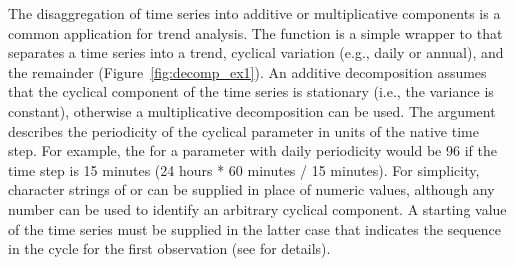 \begin{table}[!tbp]
\end{table}


The disaggregation of time series into additive or multiplicative components is a common application for trend analysis.  The  function is a simple wrapper to  \citep{Kendall83} that separates a time series into a trend, cyclical variation (e.g., daily or annual), and the remainder  (Figure~\ref{fig:decomp_ex1}).  An additive decomposition assumes that the cyclical component of the time series is stationary (i.e., the variance is constant), otherwise a multiplicative decomposition can be used.  The  argument describes the periodicity of the cyclical parameter in units of the native time step.  For example, the  for a parameter with daily periodicity would be 96 if the time step is 15 minutes (24 hours * 60 minutes / 15 minutes).  For simplicity, character strings of  or  can be supplied in place of numeric values, although any number can be used to identify an arbitrary cyclical component.  A starting value of the time series must be supplied in the latter case that indicates the sequence in the cycle for the first observation (see \href{https://stat.ethz.ch/R-manual/R-devel/library/stats/html/ts.html}{} for details).


